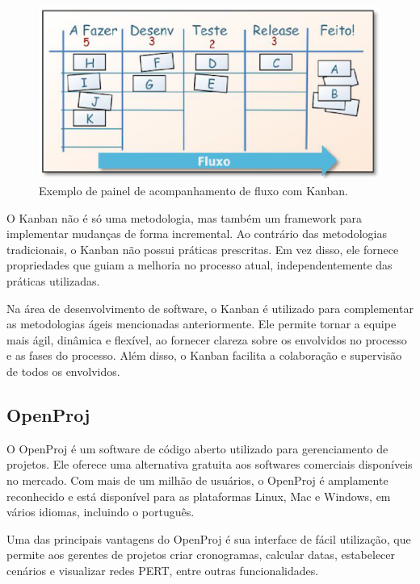 \begin{figure}[htb]
	\caption{\label{fig:Fig_2}Exemplo de painel de acompanhamento de fluxo com Kanban.}
	\begin{center}
		\includegraphics{figuras/Imagem2.png}
	\end{center}
\end{figure}

O Kanban não é só uma metodologia, mas também um framework para implementar mudanças de forma incremental. Ao contrário das metodologias tradicionais, o Kanban não possui práticas prescritas. Em vez disso, ele fornece propriedades que guiam a melhoria no processo atual, independentemente das práticas utilizadas.

Na área de desenvolvimento de software, o Kanban é utilizado para complementar as metodologias ágeis mencionadas anteriormente. Ele permite tornar a equipe mais ágil, dinâmica e flexível, ao fornecer clareza sobre os envolvidos no processo e as fases do processo. Além disso, o Kanban facilita a colaboração e supervisão de todos os envolvidos.

\subsection{OpenProj}
O OpenProj é um software de código aberto utilizado para gerenciamento de projetos. Ele oferece uma alternativa gratuita aos softwares comerciais disponíveis no mercado. Com mais de um milhão de usuários, o OpenProj é amplamente reconhecido e está disponível para as plataformas Linux, Mac e Windows, em vários idiomas, incluindo o português.

Uma das principais vantagens do OpenProj é sua interface de fácil utilização, que permite aos gerentes de projetos criar cronogramas, calcular datas, estabelecer cenários e visualizar redes PERT, entre outras funcionalidades.


